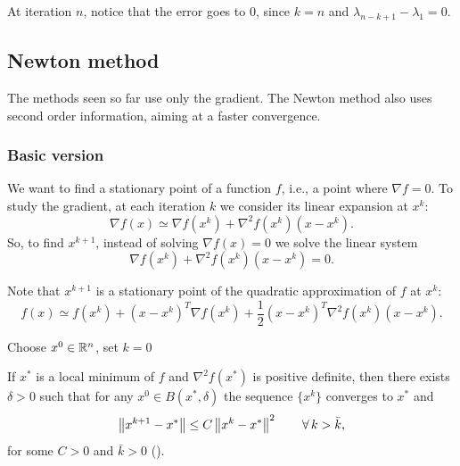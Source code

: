 At iteration $n$, notice that the error goes to $0$, since $k = n$ and $\lambda_{n-k+1} - \lambda_1 = 0$.

\subsection{Newton method}

The methods seen so far use only the gradient. The Newton method also uses second order information, aiming at a faster convergence.

\subsubsection{Basic version}

We want to find a stationary point of a function $f$, i.e., a point where $\nabla f = 0$. To study the gradient, at each iteration $k$ we consider its linear expansion at $x^k$:
\[
    \nabla f(x) \simeq \nabla f(x^k) + \nabla^2 f(x^k)(x - x^k).
\]
So, to find $x^{k+1}$, instead of solving $\nabla f(x) = 0$ we solve the linear system
\[
    \nabla f(x^k) + \nabla^2 f(x^k)(x - x^k) = 0.
\]

Note that $x^{k+1}$ is a stationary point of the quadratic approximation of $f$ at $x^k$:
\[
    f(x) \simeq f(x^k) + (x - x^k)^T\nabla f(x^k) + \frac{1}{2}(x - x^k)^T\nabla^2 f(x^k)(x - x^k).
\]

\begin{algorithm}[htbp]
\caption{Newton method (basic version)}
Choose $x^0 \in \mathbb{R}^n$, set $k = 0$\;
\end{algorithm}

\begin{theorem}[Convergence]
    If $x^*$ is a local minimum of $f$ and $\nabla^2 f(x^*)$ is positive definite, then there exists $\delta > 0$ such that for any $x^0 \in B(x^*, \delta)$ the sequence $\{x^k\}$ converges to $x^*$ and
    \[
        \left\lVert x^{k+1} - x^* \right\rVert \le C\left\lVert x^k - x^* \right\rVert^2 \qquad \forall\, k > \bar{k},
    \]
    for some $C > 0$ and $\bar{k} > 0$ ().
\end{theorem}

